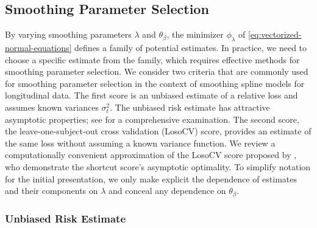 


\subsection{Smoothing Parameter Selection} \label{gaussian-unbiased-risk-estimate}

By varying smoothing parameters $\lambda$ and $\theta_\beta$, the minimizer $\phi_\lambda$ of \eqref{eq:vectorized-normal-equations} defines a family of potential estimates. In practice, we need to choose a specific estimate from the family, which requires effective methods for smoothing parameter selection. We consider two criteria that are commonly used for smoothing parameter selection in the context of smoothing spline models for longitudinal data. The first score is an unbiased estimate of a relative loss and assumes known variances $\sigma_t^2$. The unbiased risk estimate has attractive asymptotic properties; see \cite{gu2013smoothing} for a comprehensive examination. The second score, the leave-one-subject-out cross validation (LosoCV) score, provides an estimate of the same loss without assuming a known variance function. We review a computationally convenient approximation of the LosoCV score proposed by \cite{xu2012asymptotic}, who demonstrate the shortcut score's asymptotic optimality. To simplify notation for the initial presentation, we only make explicit the dependence of estimates and their components on $\lambda$ and conceal any dependence on $\theta_\beta$. 


\subsubsection{Unbiased Risk Estimate}

